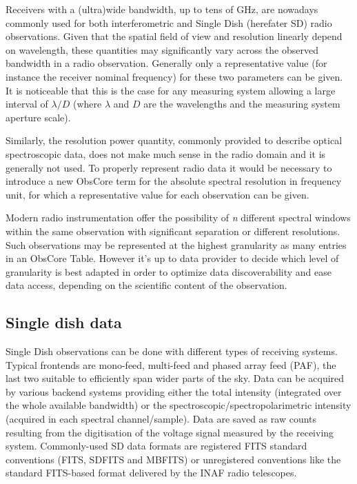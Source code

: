 \documentclass[11pt,a4paper]{ivoa}
\begin{document}
Receivers with a (ultra)wide bandwidth, up to tens of GHz, are 
nowadays commonly used for both interferometric and Single Dish (herefater SD) radio observations. 
Given that the spatial field of view and resolution linearly depend on wavelength, these quantities may significantly vary across the observed bandwidth in a radio observation. 
Generally only a representative value (for instance the
receiver nominal frequency) for these two parameters can be given. It is 
noticeable that this is the case for any measuring system allowing a large interval of 
$\lambda/D$ (where $\lambda$ and $D$ are the wavelengths and the measuring system
aperture scale).
 
Similarly, the resolution power quantity, commonly provided to describe optical spectroscopic data, does not make much sense in the radio domain and it is generally not used.
To properly represent radio data it would be necessary to introduce a new ObsCore term for the absolute spectral resolution in frequency unit, for which a representative value for each observation can be given. 

Modern radio instrumentation offer the possibility of {\it n} different spectral windows within the same observation with significant separation or different resolutions.
Such observations may be represented at the highest granularity as many entries in an ObsCore Table. However it's up to data provider to decide which level of granularity is best adapted in order to optimize data discoverability and ease data access, depending on the scientific content of the observation.



\subsection{Single dish data}\label{subsec:sd}

Single Dish observations can be done with different types of receiving systems. Typical frontends are mono-feed, multi-feed and phased array feed (PAF), the last two suitable to efficiently span wider parts of the sky. 
Data can be acquired by various backend systems providing either the total intensity (integrated over the whole available bandwidth) or the spectroscopic/spectropolarimetric intensity (acquired in each spectral channel/sample).
Data are saved as raw counts resulting from the digitisation of the voltage signal measured by the receiving system.
Commonly-used SD data formats are registered FITS standard conventions (FITS, SDFITS and MBFITS) or unregistered conventions like the standard FITS-based format delivered by the INAF radio telescopes.
\end{document}
